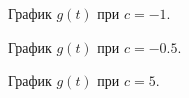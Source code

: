 \documentclass[a5paper, 10pt]{article}
\theoremstyle{definition}
\theoremstyle{plain}
\theoremstyle{remark}
\begin{document}
\begin{figure}[h!]
\caption{График $g(t)$ при $c = -1$.}
\caption{График $g(t)$ при $c = -0.5$.}
\end{figure}


\begin{figure}[h!]
\caption{График $g(t)$ при $c = 5$.}
\end{figure}
\end{document}
